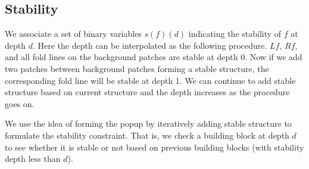 \subsection{Stability}
We associate a set of binary variables $s(f)(d)$ indicating the stability of $f$ at depth $d$. Here the depth can be interpolated as the following procedure. $Lf$, $Rf$, and all fold lines on the background patches are stable at depth 0. Now if we add two patches between background patches forming a stable structure, the corresponding fold line will be stable at depth 1. We can continue to add stable structure based on current structure and the depth increases as the procedure goes on.

We use the idea of forming the popup by iteratively adding stable structure to formulate the stability constraint. That is, we check a building block at depth $d$ to see whether it is stable or not based on previous building blocks (with stability depth less than $d$).




